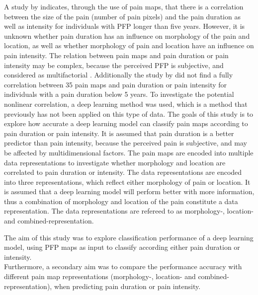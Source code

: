\noindent
A study by \citeauthor{Boudreau2017} \citep{Boudreau2017} indicates, through the use of pain maps, that there is a correlation between the size of the pain (number of pain pixels) and the pain duration as well as intensity for individuals with PFP longer than five years.\citep{Boudreau2017}
However, it is unknown whether pain duration has an influence on morphology of the pain and location, as well as  whether morphology of pain and location have an influence on pain intensity.
The relation between pain maps and pain duration or pain intensity may be complex, because the perceived PFP is subjective, and considered as multifactorial \citep{Dansie2013}. Additionally the study by \citeauthor{Boudreau2017} did not find a fully correlation between 35 pain maps and pain duration or pain intensity for individuals with a pain duration below 5 years. To investigate the potential nonlinear correlation, a deep learning method was used, which is a method that previously has not been applied on this type of data. \newline
\noindent
The goals of this study is to explore how accurate a deep learning model can classify pain maps according to pain duration or pain intensity. It is assumed that pain duration is a better predictor than pain intensity, because the perceived pain is subjective, and may be affected by multidimensional factors. 
The pain maps are encoded into multiple data representations to investigate whether morphology and location are correlated to pain duration or intensity.\newline
\noindent
The data representations are encoded into three representations, which reflect either morphology of pain or location. It is assumed that a deep learning model will perform better with more information, thus a combination of morphology and location of the pain constitute a data representation.  The data representations are refereed to as morphology-, location- and combined-representation.


\noindent
The aim of this study was to explore classification performance of a deep learning model, using PFP maps as input to classify according either pain duration or intensity. \\
\noindent
Furthermore, a secondary aim was to compare the performance accuracy with different pain map representations (morphology-, location- and combined-representation), when predicting pain duration or pain intensity. 



